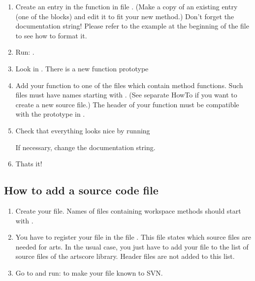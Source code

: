 \begin{enumerate}
\item Create an entry in the function  in file
  .  (Make a copy of an existing entry (one of the
   blocks) and edit it to fit your new
  method.) Don't forget the documentation string! Please refer to the
  example at the beginning of the file to see how to format it.
\item Run:
  .
\item Look in . There is a new function prototype
  \begin{quote}
  \end{quote}
\item Add your function to one of the  files which contain method
  functions. Such files must have names starting with . (See
  separate HowTo if you want to create a new source file.) The header
  of your function must be compatible with the prototype in .
\item Check that everything looks nice by running 
  \begin{quote}
  \end{quote}
  If necessary, change the documentation string.

\item Thats it!
\end{enumerate}


\subsection{How to add a source code file}
\begin{enumerate}
\item Create your file. Names of files containing workspace methods should
  start with .
\item You have to register your file in the file
  . This file states which source files
  are needed for arts. In the usual case, you just have to add your
   file to the list of source files of the artscore
  library. Header files are not added to this list.
\item Go to  and run:  to
  make your file known to SVN.
\end{enumerate}


